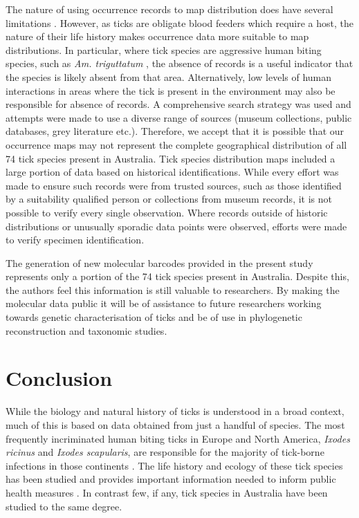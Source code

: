 \documentclass[a4paper, nobind]{templates/ociamthesis}
\begin{document}
The nature of using occurrence records to map distribution does have several limitations \autocite{fourcadeComparingSpeciesDistributions2016}.
However, as ticks are obligate blood feeders which require a host, the nature of their life history makes occurrence data more suitable to map distributions.
In particular, where tick species are aggressive human biting species, such as \emph{Am. triguttatum} \autocite{gravesTickborneInfectiousDiseases2017}, the absence of records is a useful indicator that the species is likely absent from that area.
Alternatively, low levels of human interactions in areas where the tick is present in the environment may also be responsible for absence of records.
A comprehensive search strategy was used and attempts were made to use a diverse range of sources (museum collections, public databases, grey literature etc.).
Therefore, we accept that it is possible that our occurrence maps may not represent the complete geographical distribution of all 74 tick species present in Australia.
Tick species distribution maps included a large portion of data based on historical identifications.
While every effort was made to ensure such records were from trusted sources, such as those identified by a suitability qualified person or collections from museum records, it is not possible to verify every single observation.
Where records outside of historic distributions or unusually sporadic data points were observed, efforts were made to verify specimen identification.

The generation of new molecular barcodes provided in the present study represents only a portion of the 74 tick species present in Australia.
Despite this, the authors feel this information is still valuable to researchers.
By making the molecular data public it will be of assistance to future researchers working towards genetic characterisation of ticks and be of use in phylogenetic reconstruction and taxonomic studies.

\hypertarget{conclusion}{%
\section{Conclusion}\label{conclusion}}

While the biology and natural history of ticks is understood in a broad context, much of this is based on data obtained from just a handful of species.
The most frequently incriminated human biting ticks in Europe and North America, \emph{Ixodes ricinus} and \emph{Ixodes scapularis}, are responsible for the majority of tick-borne infections in those continents \autocite{eisenBlackleggedTickIxodes2018,grayWhatWeStill2021}.
The life history and ecology of these tick species has been studied and provides important information needed to inform public health measures \autocite{grayWhatWeStill2021}.
In contrast few, if any, tick species in Australia have been studied to the same degree.
\end{document}
